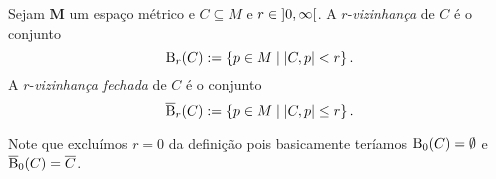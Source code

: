 \begin{definition}
Sejam $\bm M$ um espaço métrico e $C \subseteq M$ e $r \in \left]{0},{\infty}\right[$. A $r$-\emph{vizinhança} de $C$ é o conjunto
	\begin{equation*}
	\mathrm{B}_r(C) := \left\{{p \in M}\;\middle\vert\;{\left\vert{C},{p}\right\vert < r}\right\}.
	\end{equation*}
 A $r$-\emph{vizinhança fechada} de $C$ é o conjunto
	\begin{equation*}
	\overline{\mathrm{B}}_r(C) := \left\{{p \in M}\;\middle\vert\;{\left\vert{C},{p}\right\vert \leq r}\right\}.
	\end{equation*}
\end{definition}

Note que excluímos $r=0$ da definição pois basicamente teríamos $\mathrm{B}_0(C) = \emptyset$ e $\overline{\mathrm{B}}_0(C) = \overline{C}$.
	
